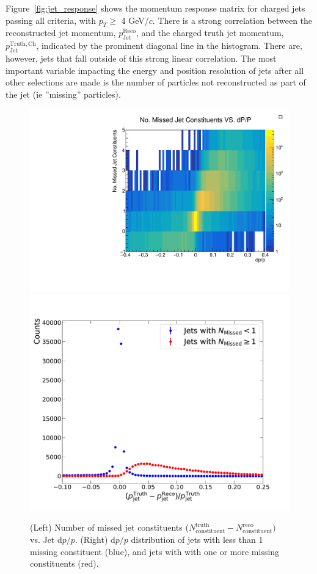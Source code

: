 Figure~\ref{fig:jet_response} shows the momentum response matrix for charged jets passing all criteria, with $p_T \ge$ 4 GeV/$c$. There is a strong correlation between the reconstructed jet momentum, $p_\mathrm{Jet}^\mathrm{Reco}$, and the charged truth jet momentum, $p_\mathrm{Jet}^\mathrm{Truth,Ch}$, indicated by the prominent diagonal line in the histogram. There are, however, jets that fall outside of this strong linear correlation. The most important variable impacting the energy and position resolution of jets after all other selections are made is the number of 
particles not reconstructed as part of the jet (ie ''missing'' particles).

\begin{figure}[htbp]
    \centering
    \includegraphics[width=0.42 \textwidth]{EIC_Jets/N_Miss_dPP}
    \includegraphics[width=0.42 \textwidth]{EIC_Jets/dPP_two_jets}
    \caption{(Left) Number of missed jet constituents ($N_\mathrm{constituent}^\mathrm{truth} - N_\mathrm{constituent}^\mathrm{reco})$ vs. Jet d$p/p$. (Right) d$p/p$ distribution of jets with less than 1 missing constituent (blue), and jets with with one or more missing constituents (red).}
    \label{fig:n_missed_vs_dpp}
\end{figure}


